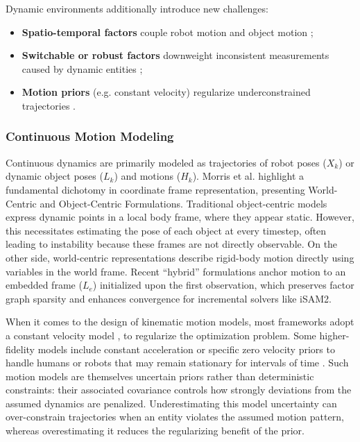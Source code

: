 Dynamic environments additionally introduce new challenges:
\begin{itemize}
    \item \textbf{Spatio-temporal factors} couple robot motion and object motion \cite{morris_dynosam_2025} \cite{zhang_semantic-integrated_2026};
    \item \textbf{Switchable or robust factors} downweight inconsistent measurements caused by dynamic entities \cite{song_rts-slam_2025} \cite{lingzhu_xiang_robust_2015};
    \item \textbf{Motion priors} (e.g. constant velocity) regularize underconstrained trajectories \cite{morris_dynosam_2025} \cite{giberna_dynemo-slam_2025} \cite{bescos_dynaslam_2021}.
\end{itemize}

\subsubsection{Continuous Motion Modeling}
Continuous dynamics are primarily modeled as trajectories of robot poses ($\mathit{X}_k$) or dynamic object poses ($\mathit{L}_k$) and motions ($\mathit{H}_k$).
Morris et al. \cite{morris_importance_2024} highlight a fundamental dichotomy in coordinate frame representation, presenting World-Centric and Object-Centric Formulations.
Traditional object-centric models express dynamic points in a local body frame, where they appear static.
However, this necessitates estimating the pose of each object at every timestep, often leading to instability because these frames are not directly observable. 
On the other side, world-centric representations describe rigid-body motion directly using variables in the world frame. 
Recent ``hybrid'' formulations \cite{morris_online_2025} anchor motion to an embedded frame ($\mathit{L}_e$) initialized upon the first observation, which preserves factor graph sparsity and enhances convergence for incremental solvers like iSAM2. 

When it comes to the design of kinematic motion models, most frameworks adopt a constant velocity model\cite{bescos_dynaslam_2021} \cite{morris_dynosam_2025}, to regularize the optimization problem. 
Some higher-fidelity models include constant acceleration \cite{brink_using_2016} or specific zero velocity priors to handle humans or robots that may remain stationary for intervals of time \cite{rosinol_3d_2020}.
Such motion models are themselves uncertain priors rather than deterministic constraints: their associated covariance controls how strongly deviations from the assumed dynamics are penalized. Underestimating this model uncertainty can over-constrain trajectories when an entity violates the assumed motion pattern, whereas overestimating it reduces the regularizing benefit of the prior.

